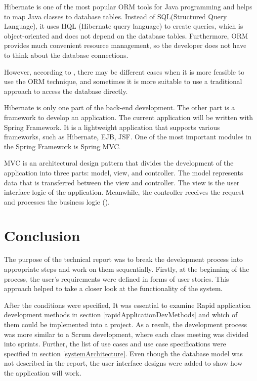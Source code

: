 \documentclass[a4paper]{article}
\begin{document}
    Hibernate is one of the most popular ORM tools for Java programming and helps to map Java classes to database tables. Instead of SQL(Structured Query Language), it uses HQL (Hibernate query language) to create queries, which is object-oriented and does not depend on the database tables. Furthermore, ORM provides much convenient resource management, so the developer does not have to think about the database connections.
    
    However, according to \cite{ottinger2014beginning}, there may be different cases when it is more feasible to use the ORM technique, and sometimes it is more suitable to use a traditional approach to access the database directly.
    
    Hibernate is only one part of the back-end development. The other part is a framework to develop an application. The current application will be written with Spring Framework. It is a lightweight application that supports various frameworks, such as Hibernate, EJB, JSF. One of the most important modules in the Spring Framework is Spring MVC. 
    
    MVC is an architectural design pattern that divides the development of the application into three parts: model, view, and controller. The model represents data that is transferred between the view and controller. The view is the user interface logic of the application. Meanwhile, the controller receives the request and processes the business logic  (\cite{mak2008spring}).
    
    

\clearpage

\section*{Conclusion}
The purpose of the technical report was to break the development process into appropriate steps
and work on them sequentially. Firstly, at the beginning of the process, the user’s requirements were defined in forms of user stories. This approach helped to take a closer look at the functionality of the system.

After the conditions were specified, It was essential to examine Rapid application development methods in section \ref{rapidApplicationDevMethods} and which of them could be implemented into a project. As a result, the development process was more similar to a Scrum development, where each class meeting was divided into sprints.
Further, the list of use cases and use case specifications were specified in section \ref{systemArchitecture}. Even though the database model was not described in the report, the user interface designs were added to show how the application will work. 


\clearpage

\section*{}
\printbibliography
\end{document}
